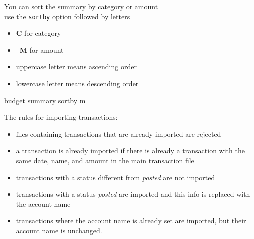 \documentclass[12pt,letterpaper]{article}
\begin{document}
\begin{framed}
    \begin{minipage}[t][3in][t]{5in}
        \Large
        You can sort the summary by category or amount\\

        use the \lstinline[language=budget,basicstyle=\Large]!sortby! option followed by letters
        \begin{itemize}
            \item \textbf{C} for category
            \item \textbf{M} for amount
            \item uppercase letter means ascending order
            \item lowercase letter means descending order
        \end{itemize}
        \begin{budget}
            budget summary sortby m
        \end{budget}
    \end{minipage}
\end{framed}
\begin{framed}
    \begin{minipage}[t][3in][t]{5in}
        \Large
        The rules for importing transactions:\\
        \normalsize
        \begin{minipage}[t]{4in}
            \begin{itemize}
                \item files containing transactions that are already imported are rejected
                \item a transaction is already imported if there is already a transaction with the same date, name, and amount in the main transaction file 
                \item transactions with a status different from \emph{posted} are not imported 
                \item transactions with a status \emph{posted} are imported and this info is replaced with the account name
                \item transactions where the account name is already set are imported, but their account name is unchanged.
            \end{itemize}
        \end{minipage}

    \end{minipage}
\end{framed}
\end{document}
